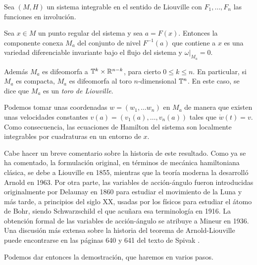 \begin{thm}\label{arnold}
Sea $(M,H)$ un sistema integrable en el sentido de Liouville con $F_1,\dots,F_n$ las funciones en involución.

   Sea $x\in M$ un punto regular del sistema y sea $a=F(x)$. Entonces la componente conexa $M_a$ del conjunto de nivel $F^{-1}(a)$ que contiene a $x$ es una variedad diferenciable invariante bajo el flujo del sistema y $\left. \omega \right|_{M_a}=0$.
  
 Además $M_a$ es difeomorfa a $\mathbb{T}^k\times \mathbb{R}^{n-k}$, para cierto $0 \leq k \leq n$. En particular, si $M_a$ es compacta, $M_a$ es difeomorfa al toro $n$-dimensional $\mathbb{T}^n$. En este caso, se dice que $M_a$ es un \emph{toro de Liouville}. 
 
 Podemos tomar unas coordenadas $w=(w_1,\dots w_n)$ en $M_a$ de manera que existen unas velocidades constantes $v(a)=(v_1(a),\dots,v_n(a))$ tales que $\dot w (t)=v$. Como consecuencia, las ecuaciones de Hamilton del sistema son localmente integrables por cuadraturas en un entorno de $x$.

\end{thm}

Cabe hacer un breve comentario sobre la historia de este resultado.
Como ya se ha comentado, la formulación original, en términos de mecánica hamiltoniana clásica, se debe a Liouville en 1855, mientras que la teoría moderna la desarrolló Arnold en 1963. Por otra parte, las variables de acción-ángulo fueron introducidas originalmente por Delaunay en 1860 para estudiar el movimiento de la Luna y más tarde, a principios del siglo XX, usadas por los físicos para estudiar el átomo de Bohr, siendo Schwarzschild el que acuñara esa terminología en 1916. La obtención formal de las variables de acción-ángulo se atribuye a Mineur en 1936. 
 Una discusión más extensa sobre la historia del teorema de Arnold-Liouville puede encontrarse en las páginas 640 y 641 del texto de Spivak \cite{spivak}.

 Podemos dar entonces la demostración, que haremos en varios pasos.

